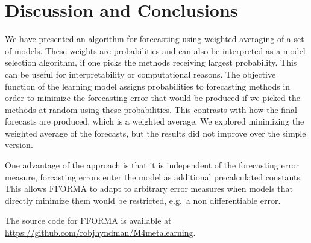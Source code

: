 \documentclass[11pt,a4paper,]{article}
\theoremstyle{definition}
\theoremstyle{definition}
\theoremstyle{definition}
\theoremstyle{remark}
\begin{document}
\section{Discussion and Conclusions}\label{conclusion}

We have presented an algorithm for forecasting using weighted averaging
of a set of models. These weights are probabilities and can also be
interpreted as a model selection algorithm, if one picks the methods
receiving largest probability. This can be useful for interpretability
or computational reasons. The objective function of the learning model
assigns probabilities to forecasting methods in order to minimize the
forecasting error that would be produced if we picked the methods at
random using these probabilities. This contrasts with how the final
forecasts are produced, which is a weighted average. We explored
minimizing the weighted average of the forecasts, but the results did
not improve over the simple version.

One advantage of the approach is that it is independent of the
forecasting error measure, forcasting errors enter the model as
additional precalculated constants This allows FFORMA to adapt to
arbitrary error measures when models that directly minimize them would
be restricted, e.g.~a non differentiable error.

The source code for FFORMA is available at
\url{https://github.com/robjhyndman/M4metalearning}.

\printbibliography[title=References]
\end{document}
